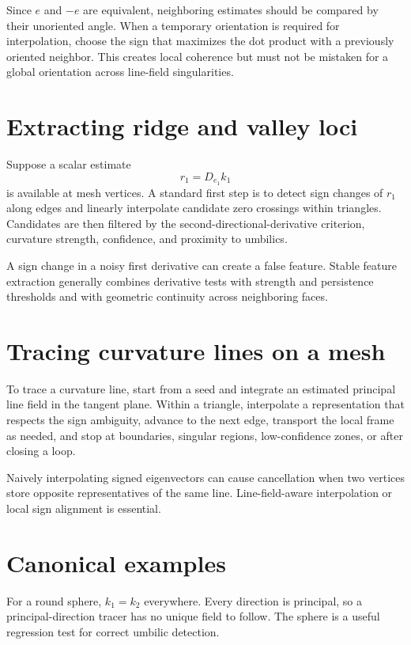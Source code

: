 Since \(e\) and \(-e\) are equivalent, neighboring estimates should be compared
by their unoriented angle.  When a temporary orientation is required for
interpolation, choose the sign that maximizes the dot product with a previously
oriented neighbor.  This creates local coherence but must not be mistaken for a
global orientation across line-field singularities.

\section{Extracting ridge and valley loci}

Suppose a scalar estimate
\[
r_1=D_{e_1}k_1
\]
is available at mesh vertices.  A standard first step is to detect sign changes
of \(r_1\) along edges and linearly interpolate candidate zero crossings within
triangles.  Candidates are then filtered by the second-directional-derivative
criterion, curvature strength, confidence, and proximity to umbilics.

\begin{remark}\label{rem:vii42-zero}
A sign change in a noisy first derivative can create a false feature.  Stable
feature extraction generally combines derivative tests with strength and
persistence thresholds and with geometric continuity across neighboring faces.
\end{remark}

\section{Tracing curvature lines on a mesh}

To trace a curvature line, start from a seed and integrate an estimated principal
line field in the tangent plane.  Within a triangle, interpolate a representation
that respects the sign ambiguity, advance to the next edge, transport the local
frame as needed, and stop at boundaries, singular regions, low-confidence zones,
or after closing a loop.

Naively interpolating signed eigenvectors can cause cancellation when two
vertices store opposite representatives of the same line.  Line-field-aware
interpolation or local sign alignment is essential.

\section{Canonical examples}

\begin{example}\label{ex:vii42-sphere}
For a round sphere, \(k_1=k_2\) everywhere.  Every direction is principal, so a
principal-direction tracer has no unique field to follow.  The sphere is a
useful regression test for correct umbilic detection.
\end{example}

